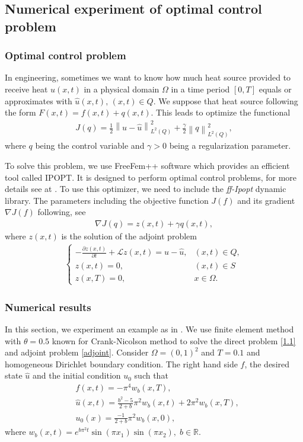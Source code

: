 \newpage
\subsection{Numerical experiment of optimal control problem}
\subsubsection{Optimal control problem}
\quad In engineering, sometimes we want to know how much heat source provided to receive heat $u(x, t)$ in a physical domain $\Omega$ in a time period $[0, T]$ equals or approximates with $\hat{u}(x, t),\, (x, t)\in Q.$ We suppose that heat source following the form $F(x, t)=f(x, t)+q(x, t)$. This leads to optimize the functional
\begin{align}\label{J}
	J(q)=\frac{1}{2}\left\|u-\hat{u}\right\|_{L^2(Q)}^2+\frac{\gamma}{2}\left\|q\right\|_{L^2(Q)}^2,
\end{align}
where $q$ being the control variable and $\gamma>0$ being a regularization parameter.

To solve this problem, we use FreeFem++ software which provides an efficient tool called IPOPT. It is designed to perform optimal control problems, for more details see at \cite{}. To use this optimizer, we need to include the \textit{ff-Ipopt} dynamic library. The parameters including the objective function $J(f)$ and its gradient $\nabla J(f)$ following, see \cite{}
\begin{align}\label{gradJ}
	\nabla J(q)=z(x, t)+\gamma q(x, t),
	\end{align}
	where $z(x, t)$ is the solution of the adjoint problem
	\begin{align}\label{adjoint} 
	\begin{cases}
		-\frac{\partial z(x, t)}{\partial t}+\mathcal{L}z(x, t)=u-\hat{u}, & (x, t)\in Q,\\
		z(x, t)=0, & (x, t)\in S\\
		z(x, T)=0, & x\in \Omega.
	\end{cases}
\end{align}

\subsubsection{Numerical results}
\quad In this section, we experiment an example as in \cite{}. We use finite element method with $\theta=0.5$ known for Crank-Nicolson method to solve the direct problem \eqref{1.1} and adjoint problem \eqref{adjoint}. Consider $\Omega=(0, 1)^2$ and $T=0.1$ and homogeneous Dirichlet boundary condition. The right hand side $f$, the desired state $\hat{u}$ and the initial condition $u_0$ such that
\begin{align*}
	&f(x, t)=-\pi^4w_b(x, T),\\
	&\hat{u}(x, t)=\frac{b^2-5}{2+b}\pi^2 w_b(x, t)+2\pi^2w_b(x, T),\\
	&u_0(x)=\frac{-1}{2+b}\pi^2w_b(x, 0),
\end{align*}
where $w_b(x, t)=e^{b\pi^2 t}\sin(\pi x_1)\sin(\pi x_2), \; b\in \mathbb{R}$.

